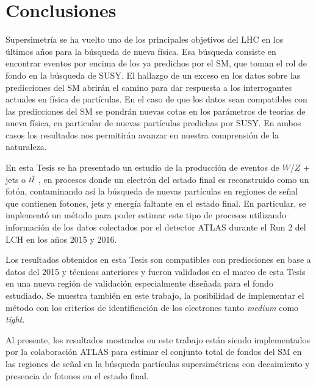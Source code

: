 \chapter{Conclusiones}

Supersimetría se ha vuelto uno de los principales objetivos del LHC en los últimos años para la búsqueda de nueva física. Esa búsqueda consiste en encontrar eventos por encima de los ya predichos por el SM, que toman el rol de fondo en la búsqueda de SUSY. El hallazgo de un exceso en los datos sobre las predicciones del SM abrirán el camino para dar respuesta a los interrogantes actuales en física de partículas. En el caso de que los datos sean compatibles con las predicciones del SM se pondrán nuevas cotas en los parámetros de teorías de nueva física, en particular de nuevas partículas predichas por SUSY. En ambos casos los resultados nos permitirán avanzar en nuestra comprensión de la naturaleza. 

En esta Tesis se ha presentado un estudio de la producción de eventos de $W$/$Z$ + jets o $t \overline{t}$ , en procesos donde un electrón del estado final es reconstruido como un fotón, contaminando así la búsqueda de nuevas partículas en regiones de señal que contienen fotones, jets y energía faltante en el estado final. En particular, se implementó un método para poder estimar este tipo de procesos utilizando información de los datos colectados por el detector ATLAS durante el Run 2 del LCH en los años 2015 y 2016.

Los resultados obtenidos en esta Tesis son compatibles con predicciones en base a datos del 2015 y técnicas anteriores \cite{Alonso:2147473,Collaboration:2198651,Schumm:1994343}  y fueron validados en el marco de esta Tesis en una nueva región de validación especialmente diseñada para el fondo estudiado. Se muestra también en este trabajo, la posibilidad de implementar el método con los criterios de identificación de los electrones tanto \textit{medium} como \textit{tight}.

Al presente, los resultados mostrados en este trabajo están siendo implementados por la colaboración ATLAS para estimar el conjunto total de fondos del SM en las regiones de señal en la búsqueda partículas supersimétricas con decaimiento y presencia de fotones en el estado final.



\clearpage